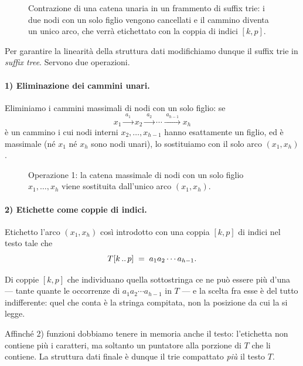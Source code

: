 \begin{figure}[H]
\centering

\caption{Contrazione di una catena unaria in un frammento di suffix trie: i due nodi
con un solo figlio vengono cancellati e il cammino  diventa un unico arco, che verrà
etichettato con la coppia di indici $[k,p]$.}
\label{fig:compattazione-abb}
\end{figure}

Per garantire la linearità della struttura dati modifichiamo dunque il suffix trie in
\emph{suffix tree}. Servono due operazioni.

\paragraph{1) Eliminazione dei cammini unari.}
Eliminiamo i cammini massimali di nodi con un solo figlio: se
\[
  x_1 \xrightarrow{\;a_1\;} x_2 \xrightarrow{\;a_2\;} \cdots
       \xrightarrow{\;a_{h-1}\;} x_h
\]
è un cammino i cui nodi interni $x_2,\dots,x_{h-1}$ hanno esattamente un figlio, ed è
massimale (né $x_1$ né $x_h$ sono nodi unari), lo sostituiamo con il solo arco $(x_1,x_h)$.

\begin{figure}[H]
\centering

\caption{Operazione 1: la catena massimale di nodi con un solo figlio $x_1,\dots,x_h$ viene
sostituita dall'unico arco $(x_1,x_h)$.}
\label{fig:compattazione-catena}
\end{figure}

\paragraph{2) Etichette come coppie di indici.}
Etichetto l'arco $(x_1,x_h)$ così introdotto con una coppia $[k,p]$ di indici nel testo tale
che
\[
  T[k\,..\,p] \;=\; a_1 a_2 \cdots a_{h-1}.
\]

\begin{osservazione}
Di coppie $[k,p]$ che individuano quella sottostringa ce ne può essere più d'una --- tante
quante le occorrenze di $a_1 a_2 \cdots a_{h-1}$ in $T$ --- e la scelta fra esse è del tutto
indifferente: quel che conta è la stringa compitata, non la posizione da cui la si legge.
\end{osservazione}

\begin{osservazione}
Affinché 2) funzioni dobbiamo tenere in memoria anche il testo: l'etichetta non contiene più
i caratteri, ma soltanto un puntatore alla porzione di $T$ che li contiene. La struttura dati
finale è dunque il trie compattato \emph{più} il testo $T$.
\end{osservazione}

